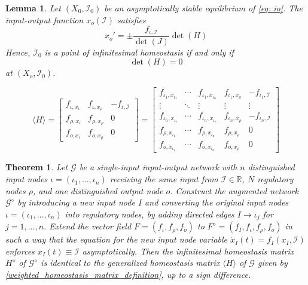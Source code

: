 \documentclass[10pt,a4paper]{amsart}
\newtheorem{lemma}{Lemma}
\newtheorem{theorem}{Theorem}
\newcommand{\II}{{\mathcal I}}
\newcommand{\PH}{H}
\begin{document}
\begin{lemma} \label{L:det}
Let $(X_0,\II_0)$ be an asymptotically stable equilibrium of \eqref{eq: io}.  The input-output function $x_o(\II)$ satisfies
\begin{equation} \label{xo'_new}
x_o' = \pm\frac{f_{\iota, \II}}{\det(J)} \det(\PH)
\end{equation}
Hence, $\II_0$ is a point of infinitesimal homeostasis if and only if 
\begin{equation} \label{xo'_reduced}
\det(\PH)= 0
\end{equation}
at $(X_o, \II_0)$.
\end{lemma}

\begin{equation} \label{weighted_homeostasis_matrix_definition}
\langle H \rangle = 
\begin{bmatrix}
f_{\iota, x_\iota} &  f_{\iota, x_\rho} & -f_{\iota, \mathcal{I}} \\
f_{\rho, x_\iota}&  f_{\rho, x_\rho} & 0 \\
f_{o, x_\iota} &  f_{o, x_\rho} & 0
\end{bmatrix} = \begin{bmatrix} f_{\iota_{1}, x_{\iota_{1}}} & \cdots & f_{\iota_{1}, x_{\iota_{n}}} & f_{\iota_{1}, x_{\rho}} & - f_{\iota_{1}, \mathcal{I}} \\
    \vdots & \ddots & \vdots & \vdots & \vdots \\
    f_{\iota_{n}, x_{\iota_{1}}} & \cdots & f_{\iota_{n}, x_{\iota_{n}}} & f_{\iota_{n}, x_{\rho}} & - f_{\iota_{n}, \mathcal{I}} \\
    f_{\rho, x_{\iota_{1}}} & \cdots & f_{\rho, x_{\iota_{n}}} & f_{\rho, x_{\rho}} & 0 \\
    f_{o, x_{\iota_{1}}} & \cdots & f_{o, x_{\iota_{n}}} & f_{o, x_{\rho}} & 0
    \end{bmatrix}
\end{equation}

\begin{theorem} \label{thm:GenH}
Let $\mathcal{G}$ be a single-input input-output network with $n$ distinguished input nodes 
$\iota = (\iota_1, \dots, \iota_n)$ receiving the same input from $\mathcal{I}\in \mathbb{R}$, $N$ regulatory nodes $\rho$, and one distinguished output node $o$.
Construct the \emph{augmented network} $\mathcal{G}^\diamond$ by introducing a new input node $I$ and converting the original input nodes $\iota = (\iota_1, \dots, \iota_n)$ into regulatory nodes, by adding directed edges 
$I \to \iota_j$ for $j = 1,\dots,n$. 
Extend the vector field $F=(f_{\iota},f_{\rho},f_o)$ to $F^\diamond=(f_{I},f_{\iota},f_{\rho},f_o)$ in such a way that the equation for the new input node variable  $\dot{x}_I(t)=f_I(x_{I},\mathcal{I})$ enforces $x_I(t)\equiv \II$ asymptotically. 
Then the infinitesimal homeostasis matrix $H^\diamond$ of $\mathcal{G}^\diamond$ is identical to the generalized homeostasis matrix $\langle H \rangle$ of $\mathcal{G}$ given by \eqref{weighted_homeostasis_matrix_definition}, up to a sign difference.
\end{theorem}
\end{document}
